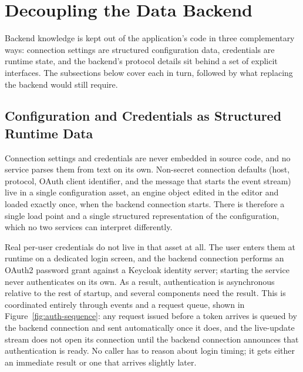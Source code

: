 \section{Decoupling the Data Backend}
\label{sec:impl-backend}

Backend knowledge is kept out of the application's code in three complementary ways: connection settings are structured configuration data, credentials are runtime state, and the backend's protocol details sit behind a set of explicit interfaces. The subsections below cover each in turn, followed by what replacing the backend would still require.

\subsection{Configuration and Credentials as Structured Runtime Data}
\label{sec:impl-dataasset}

Connection settings and credentials are never embedded in source code, and no service parses them from text on its own. Non-secret connection defaults (host, protocol, OAuth client identifier, and the message that starts the event stream) live in a single configuration asset, an engine object edited in the editor and loaded exactly once, when the backend connection starts. There is therefore a single load point and a single structured representation of the configuration, which no two services can interpret differently.

Real per-user credentials do not live in that asset at all. The user enters them at runtime on a dedicated login screen, and the backend connection performs an OAuth2 password grant against a Keycloak identity server; starting the service never authenticates on its own. As a result, authentication is asynchronous relative to the rest of startup, and several components need the result. This is coordinated entirely through events and a request queue, shown in Figure~\ref{fig:auth-sequence}: any request issued before a token arrives is queued by the backend connection and sent automatically once it does, and the live-update stream does not open its connection until the backend connection announces that authentication is ready. No caller has to reason about login timing; it gets either an immediate result or one that arrives slightly later.

